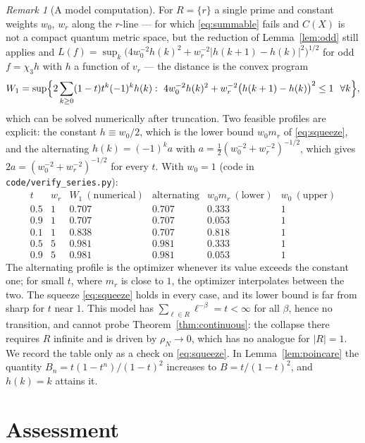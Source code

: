 \documentclass[11pt]{amsart}
\numberwithin{equation}{section}
\theoremstyle{definition}
\theoremstyle{remark}
\newtheorem{remark}[theorem]{Remark}
\begin{document}
\begin{remark}[A model computation]\label{rem:numerics}
For $R=\{r\}$ a single prime and constant weights $w_0$, $w_r$ along the $r$-line ---
for which \eqref{eq:summable} fails and $C(X)$ is not a compact quantum metric space, but
the reduction of Lemma~\ref{lem:odd} still applies and $L(f)=\sup_k\bigl(4w_0^{-2}h(k)^2+w_r^{-2}|h(k+1)-h(k)|^2\bigr)^{1/2}$
for odd $f=\chi_3h$ with $h$ a function of $v_r$ --- the distance is the convex program
\[
W_1=\sup\Bigl\{2\sum_{k\ge0}(1-t)t^k(-1)^kh(k):\ 4w_0^{-2}h(k)^2+w_r^{-2}\bigl(h(k+1)-h(k)\bigr)^2\le1\ \ \forall k\Bigr\},
\]
which can be solved numerically after truncation. Two feasible profiles are explicit: the
constant $h\equiv w_0/2$, which is the lower bound $w_0m_r$ of \eqref{eq:squeeze}, and the
alternating $h(k)=(-1)^ka$ with $a=\tfrac12(w_0^{-2}+w_r^{-2})^{-1/2}$, which gives
$2a=(w_0^{-2}+w_r^{-2})^{-1/2}$ for every $t$. With $w_0=1$ (code in \texttt{code/verify\_series.py}):
\[
\begin{array}{cccccc}
t & w_r & W_1\ (\text{numerical}) & \text{alternating} & w_0m_r\ (\text{lower}) & w_0\ (\text{upper})\\\hline
0.5 & 1 & 0.707 & 0.707 & 0.333 & 1\\
0.9 & 1 & 0.707 & 0.707 & 0.053 & 1\\
0.1 & 1 & 0.838 & 0.707 & 0.818 & 1\\
0.5 & 5 & 0.981 & 0.981 & 0.333 & 1\\
0.9 & 5 & 0.981 & 0.981 & 0.053 & 1
\end{array}
\]
The alternating profile is the optimizer whenever its value exceeds the constant one; for
small $t$, where $m_r$ is close to $1$, the optimizer interpolates between the two. The
squeeze \eqref{eq:squeeze} holds in every case, and its lower bound is far from sharp for
$t$ near $1$. This model has $\sum_{\ell\in R}\ell^{-\beta}=t<\infty$ for all $\beta$, hence
no transition, and cannot probe Theorem~\ref{thm:continuous}: the collapse there requires
$R$ infinite and is driven by $\rho_N\to0$, which has no analogue for $|R|=1$. We record
the table only as a check on \eqref{eq:squeeze}. In Lemma~\ref{lem:poincare} the quantity
$B_n=t(1-t^n)/(1-t)^2$ increases to $B=t/(1-t)^2$, and $h(k)=k$ attains it.
\end{remark}

\section{Assessment}
\end{document}
